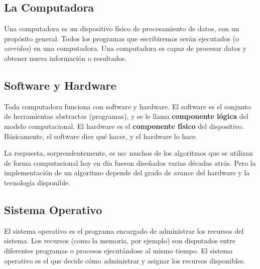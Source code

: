 \documentclass[
  letterpaper,
  DIV=11,
  numbers=noendperiod]{scrreprt}
\begin{document}
\subsection{La Computadora}\label{la-computadora}

Una computadora es un dispositivo físico de procesamiento de datos, con
un propósito general. Todos los programas que escribiremos serán
ejecutados (o \emph{corridos}) en una computadora. Una computadora es
capaz de procesar datos y obtener nueva información o resultados.

\subsection{Software y Hardware}\label{software-y-hardware}

Toda computadora funciona con software y hardware. El software es el
conjunto de herramientas abstractas (programas), y se le llama
\textbf{componente lógica} del modelo computacional. El hardware es el
\textbf{componente físico} del dispositivo. Básicamente, el software
dice qué hacer, y el hardware lo hace.

\begin{tcolorbox}[enhanced jigsaw, bottomrule=.15mm, leftrule=.75mm, opacityback=0, colback=white, toprule=.15mm, bottomtitle=1mm, opacitybacktitle=0.6, rightrule=.15mm, left=2mm, arc=.35mm, coltitle=black, title=\textcolor{quarto-callout-tip-color}{\faLightbulb}\hspace{0.5em}{\textbf{¿Es indispensable tener una computadora para crear un
algoritmo?}\\
}, breakable, toptitle=1mm, colframe=quarto-callout-tip-color-frame, titlerule=0mm, colbacktitle=quarto-callout-tip-color!10!white]

La respuesta, sorprendentemente, es no: muchos de los algoritmos que se
utilizan de forma computacional hoy en día fueron diseñados varias
décadas atrás. Pero la implementación de un algoritmo depende del grado
de avance del hardware y la tecnología disponible.

\end{tcolorbox}

\subsection{Sistema Operativo}\label{sistema-operativo}

El sistema operativo es el programa encargado de administrar los
recursos del sistema. Los recursos (como la memoria, por ejemplo) son
disputados entre diferentes programas o procesos ejecutándose al mismo
tiempo. El sistema operativo es el que decide cómo administrar y asignar
los recursos disponibles.
\end{document}
